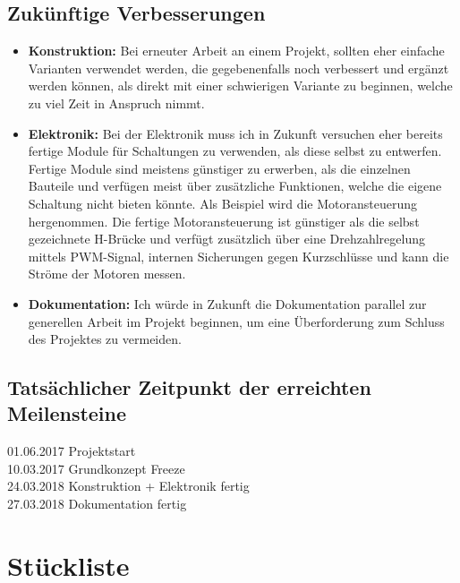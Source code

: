 \subsection{Zukünftige Verbesserungen}
\begin{itemize}
\item \textbf{Konstruktion:} Bei erneuter Arbeit an einem Projekt, sollten eher einfache Varianten verwendet werden, die gegebenenfalls noch verbessert und ergänzt werden können, als direkt mit einer schwierigen Variante zu beginnen, welche zu viel Zeit in Anspruch nimmt.
\item \textbf{Elektronik:} Bei der Elektronik muss ich in Zukunft versuchen eher bereits fertige Module für Schaltungen zu verwenden, als diese selbst zu entwerfen. Fertige Module sind meistens günstiger zu erwerben, als die einzelnen Bauteile und verfügen meist über zusätzliche Funktionen, welche die eigene Schaltung nicht bieten könnte. Als Beispiel wird die Motoransteuerung hergenommen. Die fertige Motoransteuerung ist günstiger als die selbst gezeichnete H-Brücke und verfügt zusätzlich über eine Drehzahlregelung mittels PWM-Signal, internen Sicherungen gegen Kurzschlüsse und kann die Ströme der Motoren messen.
\item \textbf{Dokumentation:} Ich würde in Zukunft die Dokumentation parallel zur generellen Arbeit im Projekt beginnen, um eine Überforderung zum Schluss des Projektes zu vermeiden.
\end{itemize}
\subsection{Tatsächlicher Zeitpunkt der erreichten Meilensteine}
01.06.2017 Projektstart\\

10.03.2017 Grundkonzept Freeze\\

24.03.2018 Konstruktion + Elektronik fertig\\

27.03.2018 Dokumentation fertig\\
\section{Stückliste}

